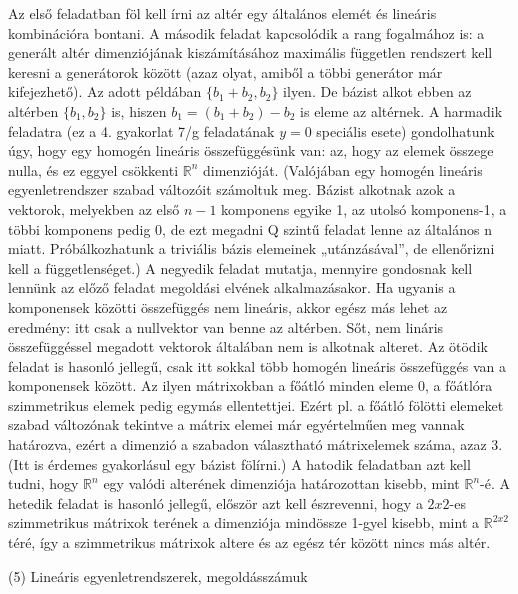\begin{frame}
  \begin{tcolorbox}[title={4/7. -Q-}]
Az első feladatban föl kell írni az altér egy általános elemét és lineáris kombinációra bontani. A második feladat kapcsolódik a rang fogalmához is: a generált altér dimenziójának kiszámításához maximális független rendszert kell keresni a generátorok között (azaz olyat, amiből a többi generátor már kifejezhető). Az adott példában $\{b_1 + b_2,b_2\}$ ilyen. De bázist alkot ebben az altérben $\{b_1,b_2\}$ is, hiszen $b_1 = (b_1 + b_2) - b_2$ is eleme az altérnek. A harmadik feladatra (ez a 4. gyakorlat 7/g feladatának $y = 0$ speciális esete) gondolhatunk úgy, hogy egy homogén lineáris összefüggésünk van: az, hogy az elemek összege nulla, és ez eggyel csökkenti $\mathbb{R}^n$ dimenzióját. (Valójában egy homogén lineáris egyenletrendszer szabad változóit számoltuk meg. Bázist alkotnak azok a vektorok, melyekben az első $n-1$ komponens egyike 1, az utolsó komponens-1, a többi komponens pedig 0, de ezt megadni Q szintű feladat lenne az általános n miatt. Próbálkozhatunk a triviális bázis elemeinek „utánzásával”, de ellenőrizni kell a függetlenséget.) A negyedik feladat mutatja, mennyire gondosnak kell lennünk az előző feladat megoldási elvének alkalmazásakor. Ha ugyanis a komponensek közötti összefüggés nem lineáris, akkor egész más lehet az eredmény: itt csak a nullvektor van benne az altérben. Sőt, nem lináris összefüggéssel megadott vektorok általában nem is alkotnak alteret. Az ötödik feladat is hasonló jellegű, csak itt sokkal több homogén lineáris összefüggés van a komponensek között. Az ilyen mátrixokban a főátló minden eleme 0, a főátlóra szimmetrikus elemek pedig egymás ellentettjei. Ezért pl. a főátló fölötti elemeket szabad változónak tekintve a mátrix elemei már egyértelműen meg vannak határozva, ezért a dimenzió a szabadon választható mátrixelemek száma, azaz 3. (Itt is érdemes gyakorlásul egy bázist fölírni.) A hatodik feladatban azt kell tudni, hogy $\mathbb{R}^n$ egy valódi alterének dimenziója határozottan kisebb, mint $\mathbb{R}^n$-é. A hetedik feladat is hasonló jellegű, először azt kell észrevenni, hogy a $2x2$-es szimmetrikus mátrixok terének a dimenziója mindössze 1-gyel kisebb, mint a $\mathbb{R}^{2 x 2}$ téré, így a szimmetrikus mátrixok altere és az egész tér között nincs más altér.
  \end{tcolorbox}
\end{frame}



\begin{frame}[plain]
\begin{tcolorbox}[center, colback={myyellow}, coltext={black}, colframe={myyellow}]
    {\RHuge  (5) Lineáris egyenletrendszerek, megoldásszámuk}
    \mmedskip
\end{tcolorbox}
\end{frame}

